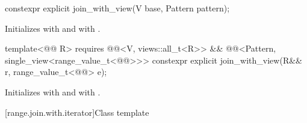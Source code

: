 \begin{itemdecl}
constexpr explicit join_with_view(V base, Pattern pattern);
\end{itemdecl}

\begin{itemdescr}
\pnum
\effects
Initializes  with  and
 with .
\end{itemdescr}

\begin{itemdecl}
template<@@ R>
  requires @@<V, views::all_t<R>> &&
           @@<Pattern, single_view<range_value_t<@@>>>
constexpr explicit join_with_view(R&& r, range_value_t<@@> e);
\end{itemdecl}

\begin{itemdescr}
\pnum
\effects
Initializes  with  and
 with .
\end{itemdescr}

[range.join.with.iterator]{Class template }

